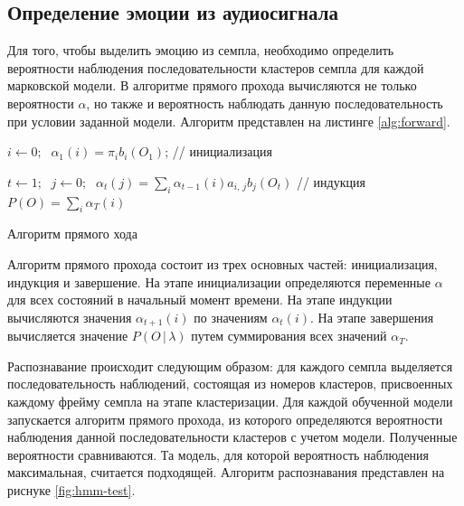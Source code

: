 \subsection{Определение эмоции из аудиосигнала}
Для того, чтобы выделить эмоцию из семпла, необходимо определить вероятности наблюдения последовательности кластеров семпла для каждой марковской модели. В алгоритме прямого прохода вычисляются не только вероятности $\alpha$, но также и вероятность наблюдать данную последовательность при условии заданной модели. Алгоритм представлен на листинге \ref{alg:forward}.
%
\begin{algorithm}[H]
	$i \leftarrow 0;\;$
	{
		$\alpha_1(i) = \pi_ib_i(O_1)$; // инициализация
	}
	
	$t \leftarrow 1;\;$
	{
		$j \leftarrow 0;\;$
		{
			$\alpha_t(j) = \displaystyle\sum_i\alpha_{t - 1}(i)a_{i,\,j}b_j(O_t)$ // индукция
		}
	}
	$P(O) = \displaystyle\sum_i\alpha_T(i)$
	\caption{Алгоритм прямого хода}
	\label{alg:forward}
\end{algorithm}
Алгоритм прямого прохода состоит из трех основных частей: инициализация, индукция и завершение. На этапе инициализации определяются переменные $\alpha$ для всех состояний в начальный момент времени. На этапе индукции вычисляются значения $\alpha_{t + 1}(i)$ по значениям $\alpha_t(i)$. На этапе завершения вычисляется значение $P(O\,|\,\lambda)$ путем суммирования всех значений $\alpha_T$.

Распознавание происходит следующим образом: для каждого семпла выделяется последовательность наблюдений, состоящая из номеров кластеров, присвоенных каждому фрейму семпла на этапе кластеризации. Для каждой обученной модели запускается алгоритм прямого прохода, из которого определяются вероятности наблюдения данной последовательности кластеров с учетом модели. Полученные вероятности сравниваются. Та модель, для которой вероятность наблюдения максимальная, считается подходящей. Алгоритм распознавания представлен на риснуке \ref{fig:hmm-test}.

